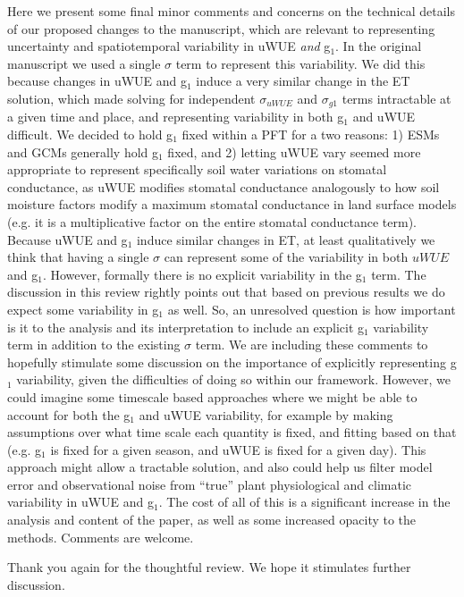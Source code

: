 \documentclass[12pt]{article}
\begin{document}
Here we present some final minor comments and concerns on the
technical details of our proposed changes to the manuscript, which are
relevant to representing uncertainty and spatiotemporal variability in
uWUE \textit{and} g$_1$. In the original manuscript we used a single
$\sigma$ term to represent this variability. We did this because
changes in uWUE and g$_1$ induce a very similar change in the ET
solution, which made solving for independent $\sigma_{uWUE}$ and
$\sigma_{g1}$ terms intractable at a given time and place, and
representing variability in both g$_1$ and uWUE difficult. We decided
to hold g$_1$ fixed within a PFT for a two reasons: 1) ESMs and GCMs
generally hold g$_1$ fixed, and 2) letting uWUE vary seemed more
appropriate to represent specifically soil water variations on
stomatal conductance, as uWUE modifies stomatal conductance
analogously to how soil moisture factors modify a maximum stomatal
conductance in land surface models (e.g. it is a multiplicative factor
on the entire stomatal conductance term). Because uWUE and g$_1$
induce similar changes in ET, at least qualitatively we think that
having a single $\sigma$ can represent some of the variability in both
$uWUE$ and g$_1$. However, formally there is no explicit variability
in the g$_1$ term. The discussion in this review rightly points out
that based on previous results we do expect some variability in g$_1$
as well. So, an unresolved question is how important is it to the
analysis and its interpretation to include an explicit g$_1$
variability term in addition to the existing $\sigma$ term. We are
including these comments to hopefully stimulate some discussion on the
importance of explicitly representing g$_1$ variability, given the
difficulties of doing so within our framework. However, we could
imagine some timescale based approaches where we might be able to
account for both the g$_1$ and uWUE variability, for example by making
assumptions over what time scale each quantity is fixed, and fitting
based on that (e.g. g$_1$ is fixed for a given season, and uWUE is
fixed for a given day). This approach might allow a tractable
solution, and also could help us filter model error and observational
noise from ``true'' plant physiological and climatic variability in
uWUE and g$_1$. The cost of all of this is a significant increase in
the analysis and content of the paper, as well as some increased
opacity to the methods. Comments are welcome.

Thank you again for the thoughtful review. We hope it stimulates
further discussion.



\end{document}

